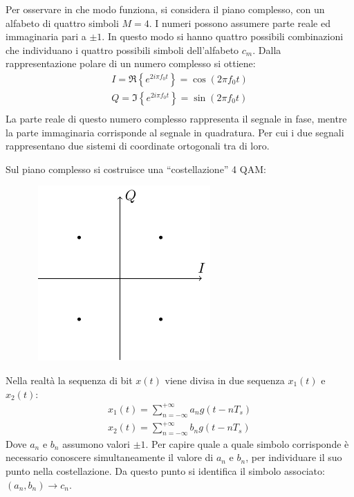 \documentclass{article}
\numberwithin{equation}{subsection}
\begin{document}
Per osservare in che modo funziona, si considera il piano complesso, con un alfabeto di quattro simboli $M=4$. I numeri possono assumere parte reale ed immaginaria pari 
a $\pm1$. In questo modo si hanno quattro possibili combinazioni che individuano i quattro possibili simboli dell'alfabeto $c_m$. 
Dalla rappresentazione polare di un numero complesso si ottiene:
\begin{gather*}
    I=\Re\left\{e^{2i\pi f_0t}\right\}=\cos(2\pi f_0t)\\
    Q=\Im\left\{e^{2i\pi f_0t}\right\}=\sin(2\pi f_0t)\\
\end{gather*}
La parte reale di questo numero complesso rappresenta il segnale in fase, mentre la parte immaginaria corrisponde al segnale in quadratura. Per cui i due segnali 
rappresentano due sistemi di coordinate ortogonali tra di loro. 


Sul piano complesso si costruisce una ``costellazione'' 4 QAM:
\begin{figure}[H]%
    \centering\
    \includegraphics{4qam.pdf}
\end{figure}


Nella realtà la sequenza di bit $x(t)$ viene divisa in due sequenza $x_1(t)$ e $x_2(t)$:
\begin{gather*}
    x_1(t)=\displaystyle\sum_{n=-\infty}^{+\infty}a_ng(t-nT_s)\\
    x_2(t)=\displaystyle\sum_{n=-\infty}^{+\infty}b_ng(t-nT_s)
\end{gather*}
Dove $a_n$ e $b_n$ assumono valori $\pm1$. Per capire quale a quale simbolo corrisponde è 
necessario conoscere simultaneamente il valore di $a_n$ e $b_n$, per individuare il suo punto nella costellazione. 
Da questo punto si identifica il simbolo associato: $(a_n,b_n)\to c_n$. 
\end{document}
